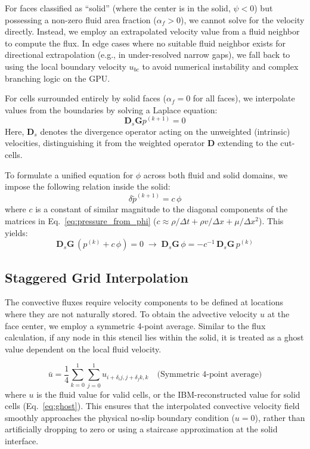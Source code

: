 \documentclass[preprint,12pt]{elsarticle}
\begin{document}
For faces classified as ``solid'' (where the center is in the solid, $\psi < 0$) but possessing a non-zero fluid area fraction ($\alpha_f > 0$), we cannot solve for the velocity directly. Instead, we employ an extrapolated velocity value from a fluid neighbor to compute the flux. In edge cases where no suitable fluid neighbor exists for directional extrapolation (e.g., in under-resolved narrow gaps), we fall back to using the local boundary velocity $u_{bc}$ to avoid numerical instability and complex branching logic on the GPU.

For cells surrounded entirely by solid faces ($\alpha_f = 0$ for all faces), we interpolate values from the boundaries by solving a Laplace equation:
\begin{equation}
    \mathbf{D}_s \mathbf{G} p^{(k+1)} = 0
\end{equation}
Here, $\mathbf{D}_s$ denotes the divergence operator acting on the unweighted (intrinsic) velocities, distinguishing it from the weighted operator $\mathbf{D}$ extending to the cut-cells.

To formulate a unified equation for $\phi$ across both fluid and solid domains, we impose the following relation inside the solid:
\begin{equation}
    \delta \tilde{p}^{(k+1)} = c\,  \phi
\end{equation}
where $c$ is a constant of similar magnitude to the diagonal components of the matrices in Eq.~\eqref{eq:pressure_from_phi} ($c\approx\rho/\Delta t+ \rho v/\Delta x+\mu/\Delta x^2$). This yields:
\begin{equation}
    \mathbf{D}_s \mathbf{G} \, (p^{(k)} + c\,  \phi) = 0 \; \rightarrow \; \mathbf{D}_s \mathbf{G} \, \phi = - c^{-1} \, \mathbf{D}_s \mathbf{G} \, p^{(k)}
\end{equation}




\subsection{Staggered Grid Interpolation}
The convective fluxes require velocity components to be defined at locations where they are not naturally stored. To obtain the advective velocity $u$ at the face center, we employ a symmetric 4-point average. Similar to the flux calculation, if any node in this stencil lies within the solid, it is treated as a ghost value dependent on the local fluid velocity.

\begin{equation}
    \bar{u} = \frac{1}{4} \sum_{k=0}^{1} \sum_{j=0}^{1} u_{i+\delta_i j, j+\delta_j k, k} \quad \text{(Symmetric 4-point average)}
\end{equation}
where $u$ is the fluid value for valid cells, or the IBM-reconstructed value for solid cells (Eq.~\eqref{eq:ghost}). This ensures that the interpolated convective velocity field smoothly approaches the physical no-slip boundary condition ($u=0$), rather than artificially dropping to zero or using a staircase approximation at the solid interface.
\end{document}
